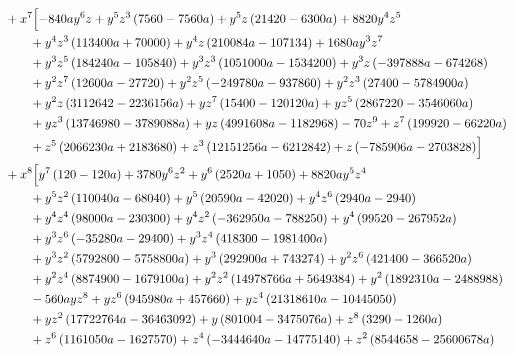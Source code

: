 \begin{align*}
&{}+x^{7}\Bigl[- 840 a y^{6} z + y^{5} z^{3} \left(7560 - 7560 a\right) + y^{5} z \left(21420 - 6300 a\right) + 8820 y^{4} z^{5}\\
&\qquad + y^{4} z^{3} \left(113400 a + 70000\right) + y^{4} z \left(210084 a - 107134\right) + 1680 a y^{3} z^{7}\\
&\qquad + y^{3} z^{5} \left(184240 a - 105840\right) + y^{3} z^{3} \left(1051000 a - 1534200\right) + y^{3} z \left(- 397888 a - 674268\right)\\
&\qquad + y^{2} z^{7} \left(12600 a - 27720\right) + y^{2} z^{5} \left(- 249780 a - 937860\right) + y^{2} z^{3} \left(27400 - 5784900 a\right)\\
&\qquad + y^{2} z \left(3112642 - 2236156 a\right) + y z^{7} \left(15400 - 120120 a\right) + y z^{5} \left(2867220 - 3546060 a\right)\\
&\qquad + y z^{3} \left(13746980 - 3789088 a\right) + y z \left(4991608 a - 1182968\right) - 70 z^{9} + z^{7} \left(199920 - 66220 a\right)\\
&\qquad + z^{5} \left(2066230 a + 2183680\right) + z^{3} \left(12151256 a - 6212842\right) + z \left(- 785906 a - 2703828\right)\Bigr]\\
&{}+x^{8}\Bigl[y^{7} \left(120 - 120 a\right) + 3780 y^{6} z^{2} + y^{6} \left(2520 a + 1050\right) + 8820 a y^{5} z^{4}\\
&\qquad + y^{5} z^{2} \left(110040 a - 68040\right) + y^{5} \left(20590 a - 42020\right) + y^{4} z^{6} \left(2940 a - 2940\right)\\
&\qquad + y^{4} z^{4} \left(98000 a - 230300\right) + y^{4} z^{2} \left(- 362950 a - 788250\right) + y^{4} \left(99520 - 267952 a\right)\\
&\qquad + y^{3} z^{6} \left(- 35280 a - 29400\right) + y^{3} z^{4} \left(418300 - 1981400 a\right)\\
&\qquad + y^{3} z^{2} \left(5792800 - 5758800 a\right) + y^{3} \left(292900 a + 743274\right) + y^{2} z^{6} \left(421400 - 366520 a\right)\\
&\qquad + y^{2} z^{4} \left(8874900 - 1679100 a\right) + y^{2} z^{2} \left(14978766 a + 5649384\right) + y^{2} \left(1892310 a - 2488988\right)\\
&\qquad - 560 a y z^{8} + y z^{6} \left(945980 a + 457660\right) + y z^{4} \left(21318610 a - 10445050\right)\\
&\qquad + y z^{2} \left(17722764 a - 36463092\right) + y \left(801004 - 3475076 a\right) + z^{8} \left(3290 - 1260 a\right)\\
&\qquad + z^{6} \left(1161050 a - 1627570\right) + z^{4} \left(- 3444640 a - 14775140\right) + z^{2} \left(8544658 - 25600678 a\right)\\

\end{align*}
